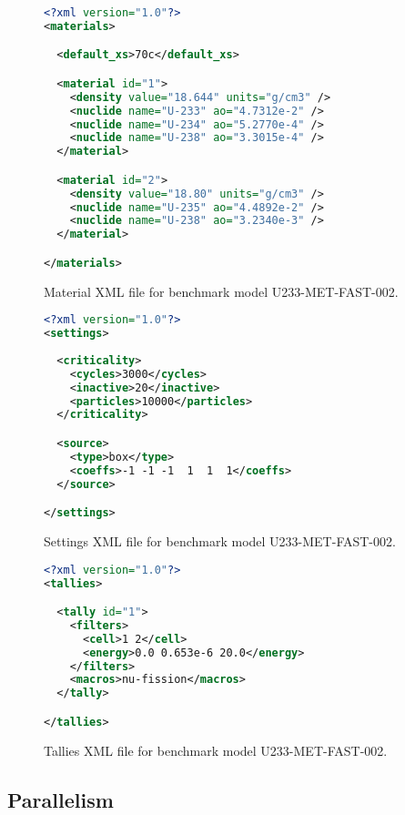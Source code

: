 \documentclass{elsarticle}
\begin{document}
\begin{figure}
  \begin{lstlisting}[language=xml]
<?xml version="1.0"?>
<materials>

  <default_xs>70c</default_xs>

  <material id="1">
    <density value="18.644" units="g/cm3" />
    <nuclide name="U-233" ao="4.7312e-2" />
    <nuclide name="U-234" ao="5.2770e-4" />
    <nuclide name="U-238" ao="3.3015e-4" />
  </material>

  <material id="2">
    <density value="18.80" units="g/cm3" />
    <nuclide name="U-235" ao="4.4892e-2" />
    <nuclide name="U-238" ao="3.2340e-3" />
  </material>

</materials>
  \end{lstlisting}
  \caption{Material XML file for benchmark model U233-MET-FAST-002.}
  \label{fig:materials-xml}
\end{figure}

\begin{figure}
  \begin{lstlisting}[language=XML]
<?xml version="1.0"?>
<settings>
 
  <criticality>
    <cycles>3000</cycles>
    <inactive>20</inactive>
    <particles>10000</particles>
  </criticality>

  <source>
    <type>box</type>
    <coeffs>-1 -1 -1  1  1  1</coeffs>
  </source>

</settings>
  \end{lstlisting}
  \caption{Settings XML file for benchmark model U233-MET-FAST-002.}
  \label{fig:settings-xml}
\end{figure}

\begin{figure}
  \begin{lstlisting}[language=XML]
<?xml version="1.0"?>
<tallies>

  <tally id="1">
    <filters>
      <cell>1 2</cell>
      <energy>0.0 0.653e-6 20.0</energy>
    </filters>
    <macros>nu-fission</macros>
  </tally>

</tallies>
  \end{lstlisting}
  \caption{Tallies XML file for benchmark model U233-MET-FAST-002.}
  \label{fig:tallies-xml}
\end{figure}

\subsection{Parallelism}
\end{document}
